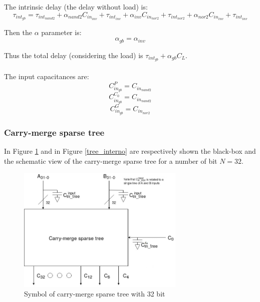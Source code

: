 The intrinsic delay (the delay without load) is:
\begin{equation}
\tau_{int_{gb}} = \tau_{int_{nand2}} + \alpha_{nand2} C_{in_{inv}} + \tau_{int_{inv}} + \alpha_{inv} C_{in_{nor2}} + \tau_{int_{nor2}} + \alpha_{nor2} C_{in_{inv}} + \tau_{int_{inv}}
\end{equation}

Then the $\alpha$ parameter is:
\begin{equation}
\alpha_{gb}=\alpha_{inv}
\end{equation}

Thus the total delay (considering the load) is $\tau_{int_{gb}}+\alpha_{gb}C_{L}$.\\\\
The input capacitances are:
\begin{equation}
C_{in_{gb}}^{P} = C_{in_{nand2}}
\end{equation}
\begin{equation}
C_{in_{gb}}^{C_0} = C_{in_{nand2}}
\end{equation}
\begin{equation}
C_{in_{gb}}^{G} = C_{in_{nor2}}
\end{equation}





\subsubsection{Carry-merge sparse tree}
In Figure \ref{tree_black_box} and in Figure \ref{tree_interno} are respectively shown the black-box and the schematic view of the carry-merge sparse tree for a number of bit $N=32$.

\begin{figure}[H]
\centering
\includegraphics[width = 8cm]{pentium/tree_black_box.jpeg}
\caption{Symbol of carry-merge sparse tree with 32 bit}
\label{tree_black_box}
\end{figure}

